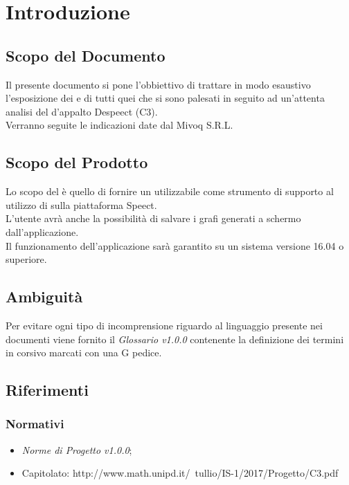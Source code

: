 \documentclass[./AnalisideiRequisiti.tex]{subfiles}
\begin{document}
	
\chapter{Introduzione}
\section{Scopo del Documento}
Il presente documento si pone l’obbiettivo di trattare in modo esaustivo l’esposizione dei  e di tutti quei  che si sono palesati in seguito ad un’attenta analisi del  d’appalto Despeect (C3).
\\ \noindent Verranno seguite le indicazioni date dal  Mivoq S.R.L.

\section{Scopo del Prodotto}

Lo scopo del  è quello di fornire un  utilizzabile come strumento di supporto al utilizzo di  sulla piattaforma Speect. 
\\ \noindent L'utente avrà anche la possibilità di salvare i grafi generati a schermo dall'applicazione.
\\ \noindent Il funzionamento dell'applicazione sarà garantito su un sistema  versione 16.04 o superiore.

\section{Ambiguità}
Per evitare ogni tipo di incomprensione riguardo al linguaggio presente nei documenti viene fornito il \textit{Glossario v1.0.0} contenente la definizione dei termini in corsivo marcati con una G pedice.

\section{Riferimenti}
\subsection{Normativi}
\begin{itemize}
	\item \textit{Norme di Progetto v1.0.0};
	\item Capitolato: http://www.math.unipd.it/~tullio/IS-1/2017/Progetto/C3.pdf
\end{itemize}
\end{document}
